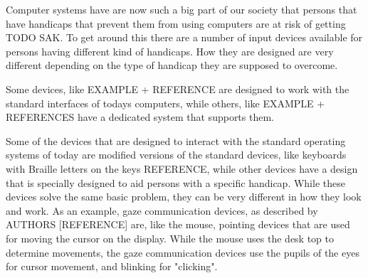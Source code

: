 \documentclass[a4paper, 11pt]{article}
\begin{document}
Computer systems have are now such a big part of our society that persons that have handicaps that prevent them from using computers are at risk of getting TODO SAK. To get around this there are a number of input devices available for persons having different kind of handicaps. How they are designed are very different depending on the type of handicap they are supposed to overcome. 

Some devices, like EXAMPLE + REFERENCE are designed to work with the standard interfaces of todays computers, while others, like EXAMPLE + REFERENCES have a dedicated system that supports them. 

Some of the devices that are designed to interact with the standard operating systems of today are modified versions of the standard devices, like keyboards with Braille letters on the keys REFERENCE, while other devices have a design that is specially designed to aid persons with a specific handicap. While these devices solve the same basic problem, they can be very different in how they look and work. As an example, gaze communication devices, as described by AUTHORS [REFERENCE] are, like the mouse, pointing devices that are used for moving the cursor on the display. While the mouse uses the desk top to determine movements, the gaze communication devices use the pupils of the eyes for cursor movement, and blinking for "clicking".
\end{document}
